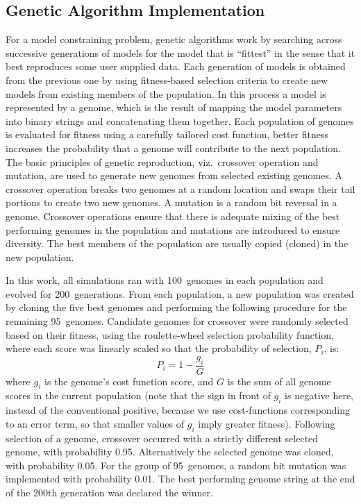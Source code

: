 \subsection{Genetic Algorithm Implementation }

For a model constraining problem, genetic algorithms work by searching
across successive generations of models for the model that is
``fittest'' in the sense that it best reproduces some user supplied
data. Each generation of models is obtained from the previous one by
using fitness-based selection criteria to create new models from
existing members of the population. In this process a model is
represented by a genome, which is the result of mapping the model
parameters into binary strings and concatenating them together. Each
population of genomes is evaluated for fitness using a carefully
tailored cost function, better fitness increases the probability that
a genome will contribute to the next population.  The basic principles
of genetic reproduction, viz.\ crossover operation and mutation, are
used to generate new genomes from selected existing genomes. A
crossover operation breaks two genomes at a random location and swaps
their tail portions to create two new genomes. A mutation is a random
bit reversal in a genome. Crossover operations ensure that there is
adequate mixing of the best performing genomes in the population and
mutations are introduced to ensure diversity. The best members of the
population are usually copied (cloned) in the new population.

\smallskip{} 

In this work, all {\GA} simulations ran with 100~genomes in each
population and evolved for 200~generations. From each population, a
new population was created by cloning the five best genomes and
performing the following procedure for the remaining 95~genomes.
Candidate genomes for crossover were randomly selected based on their
fitness, using the roulette-wheel selection probability function,
where each score was linearly scaled so that the probability of
selection, $P_i$, is:
\begin{equation} \label{eq:GA:1} 
P_{i} =1 - \frac{g_{i} }{G}
\end{equation}
\noindent where $g_i$ is the genome's cost function score, and $G$ is
the sum of all genome scores in the current population (note that the
sign in front of $g_i$ is negative here, instead of the conventional
positive, because we use cost-functions corresponding to an error
term, so that smaller values of $g_i$ imply greater
fitness). Following selection of a genome, crossover occurred with a
strictly different selected genome, with probability 0.95.
Alternatively the selected genome was cloned, with probability 0.05.
For the group of 95~genomes, a random bit mutation was implemented
with probability 0.01. The best performing genome string at the end of
the 200th generation was declared the winner.

